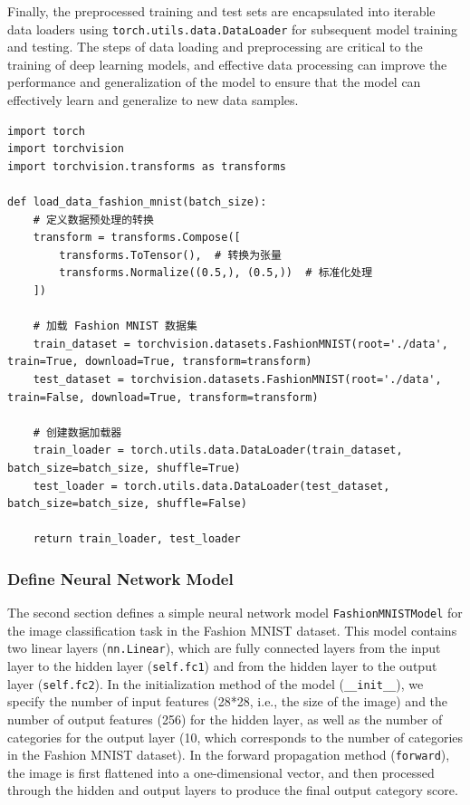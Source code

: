 \documentclass[a4paper,12pt]{article}
\begin{document}
Finally, the preprocessed training and test sets are encapsulated into iterable data loaders using \texttt{torch.utils.data.DataLoader} for subsequent model training and testing. The steps of data loading and preprocessing are critical to the training of deep learning models, and effective data processing can improve the performance and generalization of the model to ensure that the model can effectively learn and generalize to new data samples.

\begin{lstlisting}
import torch
import torchvision
import torchvision.transforms as transforms

def load_data_fashion_mnist(batch_size):
    # 定义数据预处理的转换
    transform = transforms.Compose([
        transforms.ToTensor(),  # 转换为张量
        transforms.Normalize((0.5,), (0.5,))  # 标准化处理
    ])

    # 加载 Fashion MNIST 数据集
    train_dataset = torchvision.datasets.FashionMNIST(root='./data', train=True, download=True, transform=transform)
    test_dataset = torchvision.datasets.FashionMNIST(root='./data', train=False, download=True, transform=transform)

    # 创建数据加载器
    train_loader = torch.utils.data.DataLoader(train_dataset, batch_size=batch_size, shuffle=True)
    test_loader = torch.utils.data.DataLoader(test_dataset, batch_size=batch_size, shuffle=False)

    return train_loader, test_loader

\end{lstlisting}

\subsubsection{Define Neural Network Model}

The second section defines a simple neural network model \texttt{FashionMNISTModel} for the image classification task in the Fashion MNIST dataset. This model contains two linear layers (\texttt{nn.Linear}), which are fully connected layers from the input layer to the hidden layer (\texttt{self.fc1}) and from the hidden layer to the output layer (\texttt{self.fc2}). In the initialization method of the model (\texttt{\_\_init\_\_}), we specify the number of input features (28*28, i.e., the size of the image) and the number of output features (256) for the hidden layer, as well as the number of categories for the output layer (10, which corresponds to the number of categories in the Fashion MNIST dataset). In the forward propagation method (\texttt{forward}), the image is first flattened into a one-dimensional vector, and then processed through the hidden and output layers to produce the final output category score.
\end{document}
